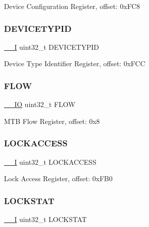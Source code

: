 Device Configuration Register, offset\+: 0x\+F\+C8 \mbox{\label{struct_m_t_b___type_afbfc4df5e76d5106a7e22475e477a468}} 
\subsubsection{\texorpdfstring{DEVICETYPID}{DEVICETYPID}}
{\footnotesize\ttfamily \mbox{\hyperlink{core__cm0plus_8h_af63697ed9952cc71e1225efe205f6cd3}{\+\_\+\+\_\+I}} uint32\+\_\+t D\+E\+V\+I\+C\+E\+T\+Y\+P\+ID}

Device Type Identifier Register, offset\+: 0x\+F\+CC \mbox{\label{struct_m_t_b___type_ae7fbeaa986ae874c8c93bb71ba6ced25}} 
\subsubsection{\texorpdfstring{FLOW}{FLOW}}
{\footnotesize\ttfamily \mbox{\hyperlink{core__cm0plus_8h_aec43007d9998a0a0e01faede4133d6be}{\+\_\+\+\_\+\+IO}} uint32\+\_\+t F\+L\+OW}

M\+TB Flow Register, offset\+: 0x8 \mbox{\label{struct_m_t_b___type_a3b3db55ca4412212bfe2c7454f2c6d5e}} 
\subsubsection{\texorpdfstring{LOCKACCESS}{LOCKACCESS}}
{\footnotesize\ttfamily \mbox{\hyperlink{core__cm0plus_8h_af63697ed9952cc71e1225efe205f6cd3}{\+\_\+\+\_\+I}} uint32\+\_\+t L\+O\+C\+K\+A\+C\+C\+E\+SS}

Lock Access Register, offset\+: 0x\+F\+B0 \mbox{\label{struct_m_t_b___type_a5937017796e3c90bd8d70273e5205549}} 
\subsubsection{\texorpdfstring{LOCKSTAT}{LOCKSTAT}}
{\footnotesize\ttfamily \mbox{\hyperlink{core__cm0plus_8h_af63697ed9952cc71e1225efe205f6cd3}{\+\_\+\+\_\+I}} uint32\+\_\+t L\+O\+C\+K\+S\+T\+AT}

